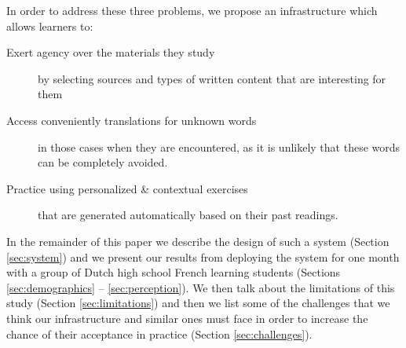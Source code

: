 In order to address these three problems, we propose an infrastructure which allows learners to: 

	\begin{description}
	
		\item [Exert agency over the materials they study] by selecting sources and types of written content that are interesting for them
	
		\item [Access conveniently translations for unknown words] in those cases when they are encountered, as it is unlikely that these words can be completely avoided.

		\item [Practice using personalized \& contextual exercises] that are generated automatically based on their past readings.

	\end{description}


\vspace {5cm}
In the remainder of this paper we describe the design of such a system (Section \ref{sec:system}) and we present our results from deploying the system for one month with a group of \students Dutch high school French learning students (Sections \ref{sec:demographics} -- \ref{sec:perception}). We then talk about the limitations of this study (Section \ref{sec:limitations}) and then we list some of the challenges that we think our infrastructure and similar ones must face in order to increase the chance of their acceptance in practice (Section \ref{sec:challenges}).


